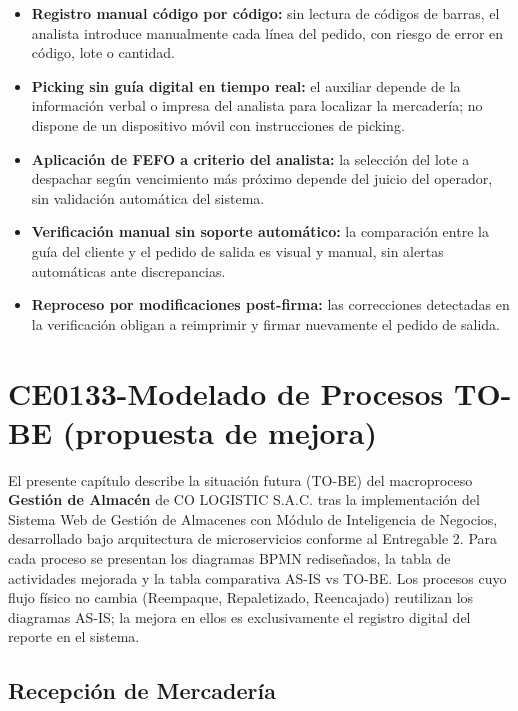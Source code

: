 \documentclass[11pt, a4paper, oneside]{report}
\begin{document}
\begin{itemize}
  \item \textbf{Registro manual código por código:} sin lectura de códigos de barras, el analista introduce manualmente cada línea del pedido, con riesgo de error en código, lote o cantidad.
  \item \textbf{Picking sin guía digital en tiempo real:} el auxiliar depende de la información verbal o impresa del analista para localizar la mercadería; no dispone de un dispositivo móvil con instrucciones de picking.
  \item \textbf{Aplicación de FEFO a criterio del analista:} la selección del lote a despachar según vencimiento más próximo depende del juicio del operador, sin validación automática del sistema.
  \item \textbf{Verificación manual sin soporte automático:} la comparación entre la guía del cliente y el pedido de salida es visual y manual, sin alertas automáticas ante discrepancias.
  \item \textbf{Reproceso por modificaciones post-firma:} las correcciones detectadas en la verificación obligan a reimprimir y firmar nuevamente el pedido de salida.
\end{itemize}


\chapter{CE0133-Modelado de Procesos TO-BE (propuesta de mejora)}

El presente capítulo describe la situación futura (TO-BE) del macroproceso \textbf{Gestión de Almacén} de CO LOGISTIC S.A.C. tras la implementación del Sistema Web de Gestión de Almacenes con Módulo de Inteligencia de Negocios, desarrollado bajo arquitectura de microservicios conforme al Entregable 2. Para cada proceso se presentan los diagramas BPMN rediseñados, la tabla de actividades mejorada y la tabla comparativa AS-IS vs TO-BE. Los procesos cuyo flujo físico no cambia (Reempaque, Repaletizado, Reencajado) reutilizan los diagramas AS-IS; la mejora en ellos es exclusivamente el registro digital del reporte en el sistema.

\section{Recepción de Mercadería}
\end{document}
